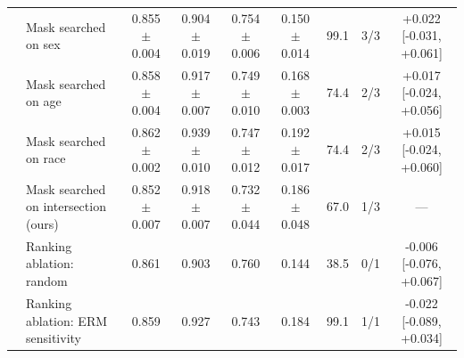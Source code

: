 \begin{table}[t]
\begin{tabular}{llccccrcc}
 & Mask searched on sex & 0.855 $\pm$ 0.004 & 0.904 $\pm$ 0.019 & 0.754 $\pm$ 0.006 & 0.150 $\pm$ 0.014 & 99.1 & 3/3 & +0.022 [-0.031, +0.061] \\
 & Mask searched on age & 0.858 $\pm$ 0.004 & 0.917 $\pm$ 0.007 & 0.749 $\pm$ 0.010 & 0.168 $\pm$ 0.003 & 74.4 & 2/3 & +0.017 [-0.024, +0.056] \\
 & Mask searched on race & 0.862 $\pm$ 0.002 & 0.939 $\pm$ 0.010 & 0.747 $\pm$ 0.012 & 0.192 $\pm$ 0.017 & 74.4 & 2/3 & +0.015 [-0.024, +0.060] \\
 & Mask searched on intersection (ours) & 0.852 $\pm$ 0.007 & 0.918 $\pm$ 0.007 & 0.732 $\pm$ 0.044 & 0.186 $\pm$ 0.048 & 67.0 & 1/3 & --- \\
 & Ranking ablation: random & 0.861 & 0.903 & 0.760 & 0.144 & 38.5 & 0/1 & -0.006 [-0.076, +0.067] \\
 & Ranking ablation: ERM sensitivity & 0.859 & 0.927 & 0.743 & 0.184 & 99.1 & 1/1 & -0.022 [-0.089, +0.034] \\
\bottomrule
\end{tabular}
\end{table}
